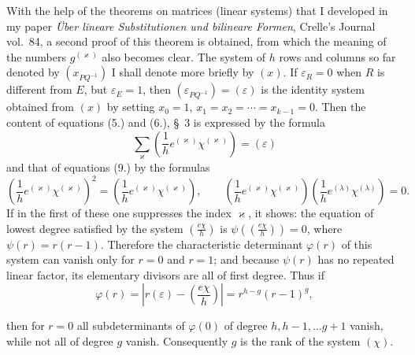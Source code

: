 \documentclass[11pt]{article}
\begin{document}
With the help of the theorems on matrices (linear systems) that I developed in my paper \emph{Über lineare Substitutionen und bilineare Formen}, Crelle's Journal vol.~84, a second proof of this theorem is obtained, from which the meaning of the numbers $g^{(\varkappa)}$ also becomes clear. The system of $h$ rows and columns so far denoted by $(x_{PQ^{-1}})$ I shall denote more briefly by $(x)$. If $\varepsilon_R=0$ when $R$ is different from $E$, but $\varepsilon_E=1$, then $(\varepsilon_{PQ^{-1}})=(\varepsilon)$ is the identity system obtained from $(x)$ by setting $x_0=1$, $x_1=x_2=\cdots=x_{k-1}=0$. Then the content of equations (5.) and (6.), \S~3 is expressed by the formula
\begin{equation*}\tag{23.}
\sum_\varkappa\left(\frac{1}{h}e^{(\varkappa)}\chi^{(\varkappa)}\right)=(\varepsilon)
\end{equation*}
and that of equations (9.) by the formulas
\begin{equation*}\tag{24.}
\left(\frac{1}{h}e^{(\varkappa)}\chi^{(\varkappa)}\right)^2=\left(\frac{1}{h}e^{(\varkappa)}\chi^{(\varkappa)}\right),
\qquad
\left(\frac{1}{h}e^{(\varkappa)}\chi^{(\varkappa)}\right)\left(\frac{1}{h}e^{(\lambda)}\chi^{(\lambda)}\right)=0.
\end{equation*}
If in the first of these one suppresses the index $\varkappa$, it shows: the equation of lowest degree satisfied by the system $\left(\frac{e\chi}{h}\right)$ is $\psi\left(\left(\frac{e\chi}{h}\right)\right)=0$, where $\psi(r)=r(r-1)$. Therefore the characteristic determinant $\varphi(r)$ of this system can vanish only for $r=0$ and $r=1$; and because $\psi(r)$ has no repeated linear factor, its elementary divisors are all of first degree. Thus if
\begin{equation*}\tag{25.}
\varphi(r)=\left|r(\varepsilon)-\left(\frac{e\chi}{h}\right)\right|=r^{h-g}(r-1)^g,
\end{equation*}


then for $r=0$ all subdeterminants of $\varphi(0)$ of degree $h,h-1,\ldots g+1$ vanish, while not all of degree $g$ vanish. Consequently $g$ is the rank of the system $(\chi)$.
\end{document}
